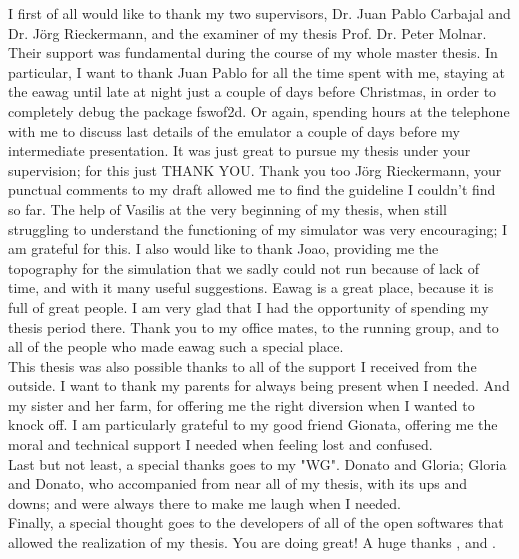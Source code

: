 \documentclass[
11pt, %
english, %
singlespacing, %
headsepline, %
]{MastersDoctoralThesis} %
\begin{document}
\begin{acknowledgements}
\addchaptertocentry{\acknowledgementname} %

I first of all would like to thank my two supervisors, Dr. Juan Pablo Carbajal and Dr. Jörg Rieckermann, and the examiner of my thesis Prof. Dr. Peter Molnar.
Their support was fundamental during the course of my whole master thesis.
In particular, I want to thank Juan Pablo for all the time spent with me, staying at the eawag until late at night just a couple of days before Christmas, in order to completely debug the package fswof2d. Or again, spending hours at the telephone with me to discuss last details of the emulator a couple of days before my intermediate presentation.
It was just great to pursue my thesis under your supervision; for this just THANK YOU.
Thank you too Jörg Rieckermann, your punctual comments to my draft allowed me to find the guideline I couldn't find so far.
The help of Vasilis at the very beginning of my thesis, when still struggling to understand the functioning of my simulator was very encouraging; I am grateful for this.
I also would like to thank Joao, providing me the topography for the simulation that we sadly could not run because of lack of time, and with it many useful suggestions.
Eawag is a great place, because it is full of great people. I am very glad that I had the opportunity of spending my thesis period there. Thank you to my office mates, to the running group, and to all of the people who made eawag such a special place.\\

This thesis was also possible thanks to all of the support I received from the outside.
I want to thank my parents for always being present when I needed.
And my sister and her farm, for offering me the right diversion when I wanted to knock off.
I am particularly grateful to my good friend Gionata, offering me the moral and technical support I needed when feeling lost and confused.\\

Last but not least, a special thanks goes to my "WG". Donato and Gloria; Gloria and Donato, who accompanied from near all of my thesis, with its ups and downs; and were always there to make me laugh when I needed.\\

Finally, a special thought goes to the developers of all of the open softwares that allowed the realization of my thesis. You are doing great! A huge thanks ,  and .

\end{acknowledgements}
\end{document}
